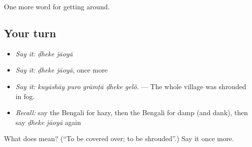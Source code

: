 \begin{grammarlens}[title={What you've built}]
One more word for getting around.
\end{grammarlens}

\subsection*{Your turn}
\begin{itemize}
\raggedright
  \item \emph{Say it:} \emph{ḍheke jāoyā}
  \item \emph{Say it:} \emph{ḍheke jāoyā}, once more
  \item \emph{Say it:} \emph{kuyāshāy puro grāmṭā ḍheke gelô.} — The whole village was shrouded in fog.
  \item \emph{Recall:} say the Bengali for hazy, then the Bengali for damp (and dank), then say \emph{ḍheke jāoyā} again
\end{itemize}

\begin{tcolorbox}[breakable,colback=teal!4,colframe=teal!35!black,title={Before you move on}]
What does   mean? (\textquotedblleft{}To be covered over; to be shrouded\textquotedblright{}.) Say it once more.
\end{tcolorbox}
